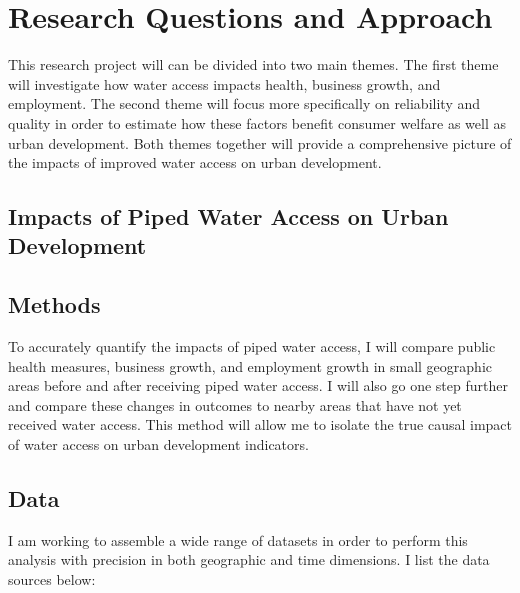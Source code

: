 \documentclass{article}
\begin{document}
\section*{Research Questions and Approach}

This research project will can be divided into two main themes.  The first theme will investigate how water access impacts health, business growth, and employment.  The second theme will focus more specifically on reliability and quality in order to estimate how these factors benefit consumer welfare as well as urban development.  Both themes together will provide a comprehensive picture of the impacts of improved water access on urban development.

\subsection{Impacts of Piped Water Access on Urban Development}

\subsection*{Methods}

To accurately quantify the impacts of piped water access, I will compare public health measures, business growth, and employment growth in small geographic areas before and after receiving piped water access.  I will also go one step further and compare these changes in outcomes to nearby areas that have not yet received water access.  This method will allow me to isolate the true causal impact of water access on urban development indicators.

\subsection*{Data}

I am working to assemble a wide range of datasets in order to perform this analysis with precision in both geographic and time dimensions.  I list the data sources below:
\end{document}
